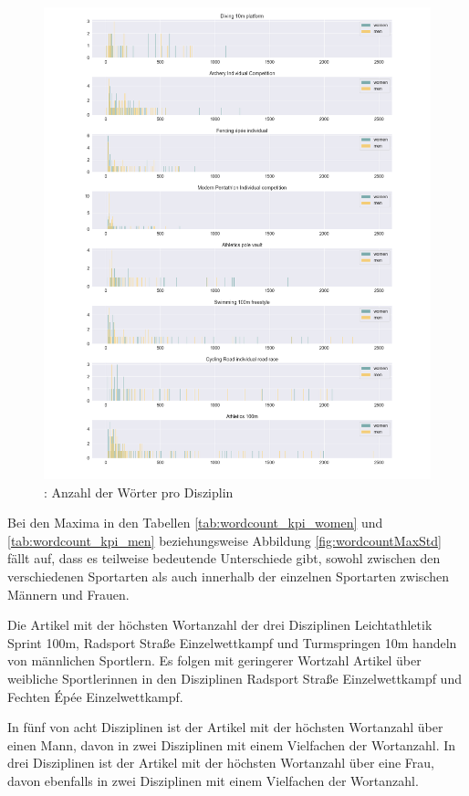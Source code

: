 \documentclass[11pt]{article}
\begin{document}
\begin{figure}
\includegraphics[width=1\textwidth]{figures/wordcount_disciplines_histogram.png}
\caption[Anzahl der Wörter pro Disziplin]{: Anzahl der Wörter pro Disziplin}
\label{fig:wordcountDisciplinesHistogram}
\end{figure}

Bei den Maxima in den Tabellen \ref{tab:wordcount_kpi_women} und \ref{tab:wordcount_kpi_men} beziehungsweise Abbildung \ref{fig:wordcountMaxStd} fällt auf, dass es teilweise bedeutende Unterschiede gibt, sowohl zwischen den verschiedenen Sportarten als auch innerhalb der einzelnen Sportarten zwischen Männern und Frauen.

Die Artikel mit der höchsten Wortanzahl der drei Disziplinen Leichtathletik Sprint 100m, Radsport Straße Einzelwettkampf und Turmspringen 10m handeln von männlichen Sportlern. Es folgen mit geringerer Wortzahl Artikel über weibliche Sportlerinnen in den Disziplinen Radsport Straße Einzelwettkampf und Fechten Épée Einzelwettkampf.

In fünf von acht Disziplinen ist der Artikel mit der höchsten Wortanzahl über einen Mann, davon in zwei Disziplinen mit einem Vielfachen der Wortanzahl.
In drei Disziplinen ist der Artikel mit der höchsten Wortanzahl über eine Frau, davon ebenfalls in zwei Disziplinen mit einem Vielfachen der Wortanzahl.
\end{document}
